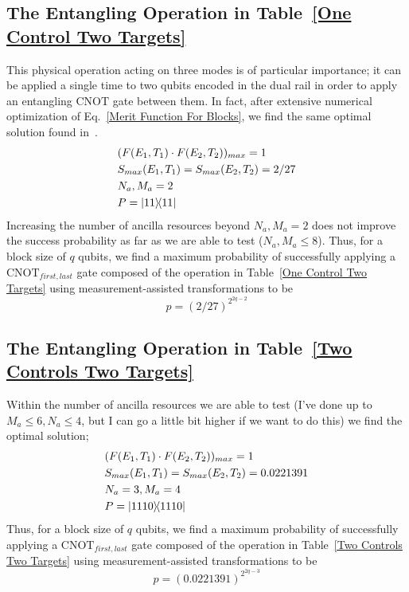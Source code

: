 \documentclass[aps,pra,twocolumn,showpacs,superscriptaddress,floatfix,10pt]{revtex4}
\begin{document}
\subsection{The Entangling Operation in Table~\ref{One Control Two Targets}}
This physical operation acting on three modes is of particular importance; it can be applied a single time to two qubits encoded in the dual rail in order to apply an entangling $\mbox{CNOT}$ gate between them. In fact, after extensive numerical optimization of Eq.~\ref{Merit Function For Blocks}, we find the same optimal solution found in~\cite{Uskov}.
\begin{eqnarray}
& (F(E_1,T_1) \cdot F(E_2,T_2))_{max} = 1 \nonumber \\
& S_{max}(E_1,T_1) = S_{max}(E_2,T_2) = 2/27 \\
& N_a,M_a=2 \nonumber \\
& P = \outerproduct{11}{11} \nonumber	
\end{eqnarray}
Increasing the number of ancilla resources beyond $N_a,M_a=2$ does not improve the success probability as far as we are able to test ($N_a,M_a \le 8$). Thus, for a block size of $q$ qubits, we find a maximum probability of successfully applying a $\mbox{CNOT}_{first,last}$ gate composed of the operation in Table~\ref{One Control Two Targets} using measurement-assisted transformations to be
\begin{equation}
\label{1C2T Result}
p = (2/27)^{2^{2q-2}}
\end{equation}
\subsection{The Entangling Operation in Table~\ref{Two Controls Two Targets}}
Within the number of ancilla resources we are able to test (I've done up to $M_a \le 6,N_a \le 4$, but I can go a little bit higher if we want to do this) we find the optimal solution;
\begin{eqnarray}
&(F(E_1,T_1) \cdot F(E_2,T_2))_{max} = 1 \nonumber \\
&S_{max}(E_1,T_1) = S_{max}(E_2,T_2) = 0.0221391 \\
&N_a = 3,M_a=4 \nonumber \\
&P = \outerproduct{1110}{1110} \nonumber	
\end{eqnarray}
Thus, for a block size of $q$ qubits, we find a maximum probability of successfully applying a $\mbox{CNOT}_{first,last}$ gate composed of the operation in Table~\ref{Two Controls Two Targets} using measurement-assisted transformations to be
\begin{equation}
\label{2C2T Result}
p = (0.0221391)^{2^{2q-3}}
\end{equation}
\end{document}
